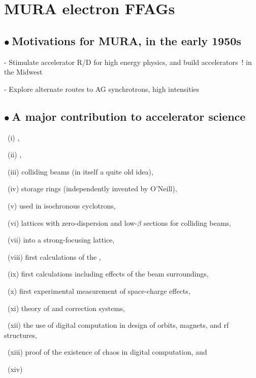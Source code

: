 \documentclass[12pt]{article}
\newcommand{\nib}{\noindent \ensuremath{\bullet~}}
\newcommand{\nin}{\noindent~}
\begin{document}
\clearpage 

\section{\LARGE  MURA electron FFAGs }

\large  


{\fontsize{19}{23} \selectfont

\subsection*{\LARGE \nib Motivations for MURA, in the early 1950s}

- Stimulate accelerator R/D for high energy physics, and build accelerators~! in the Midwest

- Explore alternate routes to AG synchrotrons, high intensities

} %

\medskip 

\subsection*{\LARGE \nib A major contribution to accelerator science~\cite{FTCole}}

{\fontsize{18}{24} \selectfont

\nin (i) ,

\nin (ii) ,

\nin (iii) colliding beams (in itself a quite old idea),

\nin (iv) storage rings (independently invented by O'Neill),

\nin (v)  used in isochronous cyclotrons,

\nin (vi) lattices with zero-dispersion and low-$\beta$ sections for colliding beams,

\nin (vii)  into a strong-focusing lattice,

\nin (viii) first calculations of the ,

\nin (ix) first  calculations including effects of the beam surroundings,

\nin (x) first experimental measurement of space-charge effects,

\nin (xi) theory of  and correction systems,

\nin (xii) the use of digital computation in design of orbits, magnets, and rf structures,

\nin (xiii) proof of the existence of chaos in digital computation, and

\nin (xiv) 

} %
\end{document}
